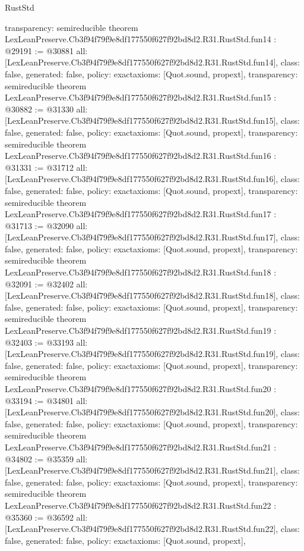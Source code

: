 \begin{lexlean}{RustStd}
\begin{coremodule}
{  transparency: semireducible
}
theorem LexLeanPreserve.Cb3f94f79f9e8df177550f627f92bd8d2.R31.RustStd.fun14 : @29191 := @30881 {
  all: [LexLeanPreserve.Cb3f94f79f9e8df177550f627f92bd8d2.R31.RustStd.fun14],
  class: false,
  generated: false,
  policy: exact{axioms: [Quot.sound, propext]},
  transparency: semireducible
}
theorem LexLeanPreserve.Cb3f94f79f9e8df177550f627f92bd8d2.R31.RustStd.fun15 : @30882 := @31330 {
  all: [LexLeanPreserve.Cb3f94f79f9e8df177550f627f92bd8d2.R31.RustStd.fun15],
  class: false,
  generated: false,
  policy: exact{axioms: [Quot.sound, propext]},
  transparency: semireducible
}
theorem LexLeanPreserve.Cb3f94f79f9e8df177550f627f92bd8d2.R31.RustStd.fun16 : @31331 := @31712 {
  all: [LexLeanPreserve.Cb3f94f79f9e8df177550f627f92bd8d2.R31.RustStd.fun16],
  class: false,
  generated: false,
  policy: exact{axioms: [Quot.sound, propext]},
  transparency: semireducible
}
theorem LexLeanPreserve.Cb3f94f79f9e8df177550f627f92bd8d2.R31.RustStd.fun17 : @31713 := @32090 {
  all: [LexLeanPreserve.Cb3f94f79f9e8df177550f627f92bd8d2.R31.RustStd.fun17],
  class: false,
  generated: false,
  policy: exact{axioms: [Quot.sound, propext]},
  transparency: semireducible
}
theorem LexLeanPreserve.Cb3f94f79f9e8df177550f627f92bd8d2.R31.RustStd.fun18 : @32091 := @32402 {
  all: [LexLeanPreserve.Cb3f94f79f9e8df177550f627f92bd8d2.R31.RustStd.fun18],
  class: false,
  generated: false,
  policy: exact{axioms: [Quot.sound, propext]},
  transparency: semireducible
}
theorem LexLeanPreserve.Cb3f94f79f9e8df177550f627f92bd8d2.R31.RustStd.fun19 : @32403 := @33193 {
  all: [LexLeanPreserve.Cb3f94f79f9e8df177550f627f92bd8d2.R31.RustStd.fun19],
  class: false,
  generated: false,
  policy: exact{axioms: [Quot.sound, propext]},
  transparency: semireducible
}
theorem LexLeanPreserve.Cb3f94f79f9e8df177550f627f92bd8d2.R31.RustStd.fun20 : @33194 := @34801 {
  all: [LexLeanPreserve.Cb3f94f79f9e8df177550f627f92bd8d2.R31.RustStd.fun20],
  class: false,
  generated: false,
  policy: exact{axioms: [Quot.sound, propext]},
  transparency: semireducible
}
theorem LexLeanPreserve.Cb3f94f79f9e8df177550f627f92bd8d2.R31.RustStd.fun21 : @34802 := @35359 {
  all: [LexLeanPreserve.Cb3f94f79f9e8df177550f627f92bd8d2.R31.RustStd.fun21],
  class: false,
  generated: false,
  policy: exact{axioms: [Quot.sound, propext]},
  transparency: semireducible
}
theorem LexLeanPreserve.Cb3f94f79f9e8df177550f627f92bd8d2.R31.RustStd.fun22 : @35360 := @36592 {
  all: [LexLeanPreserve.Cb3f94f79f9e8df177550f627f92bd8d2.R31.RustStd.fun22],
  class: false,
  generated: false,
  policy: exact{axioms: [Quot.sound, propext]},
}
\end{coremodule}
\end{lexlean}
